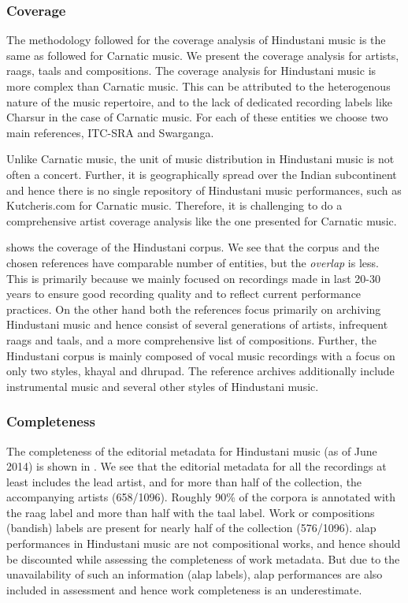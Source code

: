 \subsubsection{Coverage}
The methodology followed for the coverage analysis of Hindustani music is the same as followed for Carnatic music. We present the coverage analysis for artists, \glspl{raag}, \glspl{taal} and compositions. The coverage analysis for Hindustani music is more complex than Carnatic music. This can be attributed to the heterogenous nature of the music repertoire, and to the lack of dedicated recording labels like Charsur in the case of Carnatic music. For each of these entities we choose two main references, ITC-SRA and Swarganga. 

Unlike Carnatic music, the unit of music distribution in Hindustani music is not often a concert. Further, it is geographically spread over the Indian subcontinent and hence there is no single repository of Hindustani music performances, such as Kutcheris.com for Carnatic music. Therefore, it is challenging to do a comprehensive artist coverage analysis like the one presented for Carnatic music. 

 shows the coverage of the Hindustani corpus. We see that the corpus and the chosen references have comparable number of entities, but the \textit{overlap} is less. This is primarily because we mainly focused on recordings made in last 20-30 years to ensure good recording quality and to reflect current performance practices. On the other hand both the references focus primarily on archiving Hindustani music and hence consist of several generations of artists, infrequent \glspl{raag} and \glspl{taal}, and a more comprehensive list of compositions. Further, the Hindustani corpus is mainly composed of vocal music recordings with a focus on only two styles, \gls{khayal} and \gls{dhrupad}. The reference archives additionally include instrumental music and several other styles of Hindustani music. 
\subsubsection{Completeness}
The completeness of the editorial metadata for Hindustani music (as of June 2014) is shown in . We see that the editorial metadata for all the recordings at least includes the lead artist, and for more than half of the collection, the accompanying artists (658/1096). Roughly 90\% of the corpora is annotated with the \gls{raag} label and more than half with the \gls{taal} label. Work or compositions (\gls{bandish}) labels are present for nearly half of the collection (576/1096). \Gls{alap} performances in Hindustani music are not compositional works, and hence should be discounted while assessing the completeness of work metadata. But due to the unavailability of such an information (\gls{alap} labels), \gls{alap} performances are also included in assessment and hence work completeness is an underestimate. 

